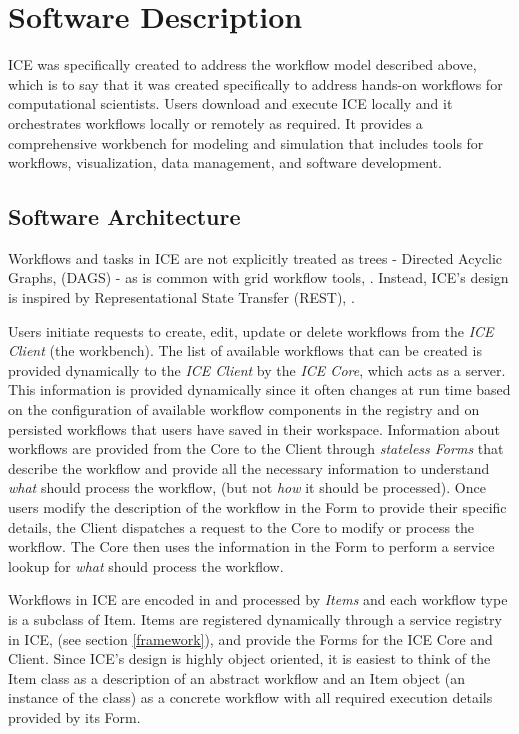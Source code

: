 \section{Software Description}\label{software-description}

ICE was specifically created to address the workflow model described
above, which is to say that it was created specifically to address
hands-on workflows for computational scientists. Users download and
execute ICE locally and it orchestrates workflows locally or remotely as
required. It provides a comprehensive workbench for modeling and
simulation that includes tools for workflows, visualization, data
management, and software development.

\subsection{Software Architecture}\label{software-architecture}

Workflows and tasks in ICE are not explicitly treated as trees -
Directed Acyclic Graphs, (DAGS) - as is common with grid workflow tools,
\cite{yu_taxonomy_2005}. Instead, ICE's design is inspired by Representational
State Transfer (REST), \cite{fielding_architectural_2000}.

Users initiate requests to create, edit, update or delete workflows from
the \emph{ICE Client} (the workbench). The list of available workflows
that can be created is provided dynamically to the \emph{ICE Client} by
the \emph{ICE Core}, which acts as a server. This information is
provided dynamically since it often changes at run time based on the
configuration of available workflow components in the registry and on
persisted workflows that users have saved in their workspace.
Information about workflows are provided from the Core to the Client
through \emph{stateless Forms} that describe the workflow and provide
all the necessary information to understand \emph{what} should process
the workflow, (but not \emph{how} it should be processed). Once users
modify the description of the workflow in the Form to provide their
specific details, the Client dispatches a request to the Core to modify
or process the workflow. The Core then uses the information in the Form
to perform a service lookup for \emph{what} should process the workflow.

Workflows in ICE are encoded in and processed by \emph{Items} and each
workflow type is a subclass of Item. Items are registered dynamically
through a service registry in ICE, (see section \ref{framework}), and
provide the Forms for the ICE Core and Client. Since ICE's design is
highly object oriented, it is easiest to think of the Item class as a
description of an abstract workflow and an Item object (an instance of
the class) as a concrete workflow with all required execution details
provided by its Form.

